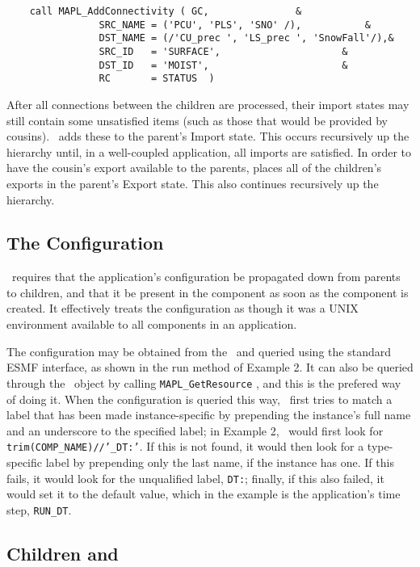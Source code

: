 \begin{verbatim}
	call MAPL_AddConnectivity ( GC,    			  &
                SRC_NAME = ('PCU', 'PLS', 'SNO' /),   		  &
                DST_NAME = (/'CU_prec ', 'LS_prec ', 'SnowFall'/),&
                SRC_ID   = 'SURFACE',          			  &
                DST_ID   = 'MOIST',         			  &
                RC       = STATUS  )
\end{verbatim}

After all connections between the children are processed, their import
states may still contain some unsatisfied items (such as those that
would be provided by cousins). \ggn\   adds these to the
parent's Import state. This occurs recursively up the hierarchy
until, in a well-coupled application, all imports are satisfied.  In
order to have the cousin's export available to the parents, \ggn
 places all of the children's exports in the parent's Export
state. This also continues recursively up the hierarchy.



\subsection{The Configuration}

\ggn\  requires that the application's configuration be propagated down
from parents to children, and that it be present in the component as
soon as the component is created. It effectively treats the configuration as
though it was a UNIX environment available to all components in an
application.

The configuration may be obtained from the \egc\  and
queried using the standard ESMF interface, as shown in the run method
of Example 2.
It can also be queried through the \ggn\  object by calling {\tt  MAPL\_GetResource} , and
this is the prefered way of doing it. When the configuration is
queried this way, \ggn\  first tries to match a label that has been made
instance-specific by prepending the instance's full name and an underscore
to the specified label; in Example 2, \ggn\  would first look for {\tt
  trim(COMP\_NAME)//'\_DT:'}. If this is not found, it would then look for
a type-specific label by prepending only the last name, if the
instance has one. If this fails, it would look for the
unqualified label, {\tt DT:}; finally, if this also failed, it would
set it to the default value, which in the example is the application's
time step, {\tt RUN\_DT}.
 


\subsection{Children and \ssv}

